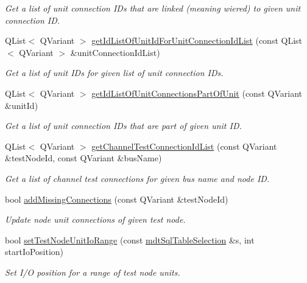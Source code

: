 \begin{DoxyCompactItemize}
\begin{DoxyCompactList}\small\item\em Get a list of unit connection I\-Ds that are linked (meaning wiered) to given unit connection I\-D. \end{DoxyCompactList}\item 
Q\-List$<$ Q\-Variant $>$ \hyperlink{classmdt_tt_test_node_a6e72542d6a7e1773cc228d9cfc9f3be8}{get\-Id\-List\-Of\-Unit\-Id\-For\-Unit\-Connection\-Id\-List} (const Q\-List$<$ Q\-Variant $>$ \&unit\-Connection\-Id\-List)
\begin{DoxyCompactList}\small\item\em Get a list of unit I\-Ds for given list of unit connection I\-Ds. \end{DoxyCompactList}\item 
Q\-List$<$ Q\-Variant $>$ \hyperlink{classmdt_tt_test_node_aedbfa25bedac04b859b1cb3ef6a16510}{get\-Id\-List\-Of\-Unit\-Connections\-Part\-Of\-Unit} (const Q\-Variant \&unit\-Id)
\begin{DoxyCompactList}\small\item\em Get a list of unit connection I\-Ds that are part of given unit I\-D. \end{DoxyCompactList}\item 
Q\-List$<$ Q\-Variant $>$ \hyperlink{classmdt_tt_test_node_a07b8cd098d61c3f14d3ba226c1d1f1cb}{get\-Channel\-Test\-Connection\-Id\-List} (const Q\-Variant \&test\-Node\-Id, const Q\-Variant \&bus\-Name)
\begin{DoxyCompactList}\small\item\em Get a list of channel test connections for given bus name and node I\-D. \end{DoxyCompactList}\item 
bool \hyperlink{classmdt_tt_test_node_a65478d5d026969e8b17464707fc3551d}{add\-Missing\-Connections} (const Q\-Variant \&test\-Node\-Id)
\begin{DoxyCompactList}\small\item\em Update node unit connections of given test node. \end{DoxyCompactList}\item 
bool \hyperlink{classmdt_tt_test_node_acfc06c2a3c2ab5b1c9e09dc9ba391f5f}{set\-Test\-Node\-Unit\-Io\-Range} (const \hyperlink{classmdt_sql_table_selection}{mdt\-Sql\-Table\-Selection} \&s, int start\-Io\-Position)
\begin{DoxyCompactList}\small\item\em Set I/\-O position for a range of test node units. \end{DoxyCompactList}\item 

\end{DoxyCompactItemize}
